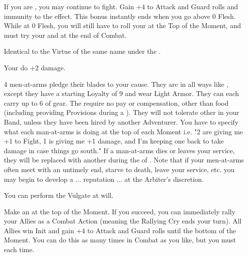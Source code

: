 \begin{multicols*}{2}


If you are , you may continue to fight.  Gain +4 to Attack and Guard rolls and immunity to the  effect.  This bonus instantly ends when you go above 0 Flesh.  While at 0 Flesh, you will still have to roll your \DEATH at the Top of the Moment, and must try your \INSANITY and \INJURY at the end of Combat.


Identical to the Virtue of the same name under the .


Your  do +2 damage. 


4 men-at-arms pledge their blades to your cause. They are  in all ways like , except they have a starting Loyalty of 9 and wear Light Armor. They can each carry up to 6  of gear. The require no pay or compensation, other than food (including providing Provisions during a ). They will not tolerate other  in your Band, unless they have been hired by another Adventurer. You have to specify what each man-at-arms is doing at the top of each Moment i.e. "2 are giving me +1 to Fight, 1 is giving me +1 damage, and I'm keeping one back to take damage in case things go south."  If a man-at-arms dies or leaves your service, they will be replaced with another during the  of . Note that if your men-at-arms often meet with an untimely end, starve to death, leave your service, etc. you may begin to develop a ... reputation ... at the Arbiter's discretion.



You can perform the  Vulgate at will.


Make an \RSTRY{\PRE} at the top of the Moment. If you succeed, you can immediately rally your Allies as a Combat Action (meaning the Rallying Cry ends your turn).  All Allies win Init and gain +4 to Attack and Guard rolls until the bottom of the Moment. You can do this as many times in Combat as you like, but you must \RSTRY{\PRE} each time. 


\end{multicols*}
